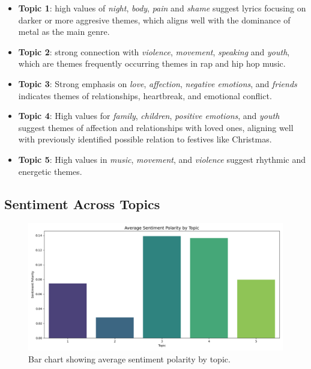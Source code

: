 \begin{itemize}
  \item \textbf{Topic 1}: high values of \textit{night}, \textit{body},
    \textit{pain} and \textit{shame} suggest lyrics focusing on darker or more
    aggresive themes, which aligns well with the dominance of metal as the main
    genre.
  \item \textbf{Topic 2}: strong connection with \textit{violence},
    \textit{movement}, \textit{speaking} and \textit{youth}, which are themes
    frequently occurring themes in rap and hip hop music.
  \item \textbf{Topic 3}: Strong emphasis on \textit{love}, \textit{affection},
    \textit{negative emotions}, and \textit{friends} indicates themes of
    relationships, heartbreak, and emotional conflict.
  \item \textbf{Topic 4}: High values for \textit{family}, \textit{children},
    \textit{positive emotions}, and \textit{youth} suggest themes of affection
    and relationships with loved ones, aligning well with previously identified
    possible relation to festives like Christmas.   
  \item \textbf{Topic 5}: High values in \textit{music}, \textit{movement}, and
    \textit{violence} suggest rhythmic and energetic themes.
\end{itemize}

\subsection{Sentiment Across Topics}
\begin{center}
\begin{figure}[H]
  \centering
  \includegraphics[width=5in]{img/lda_sentiment.png}
  \caption{Bar chart showing average sentiment polarity by topic.}
  \label{Figure:fig_eh}
\end{figure}
\end{center}

